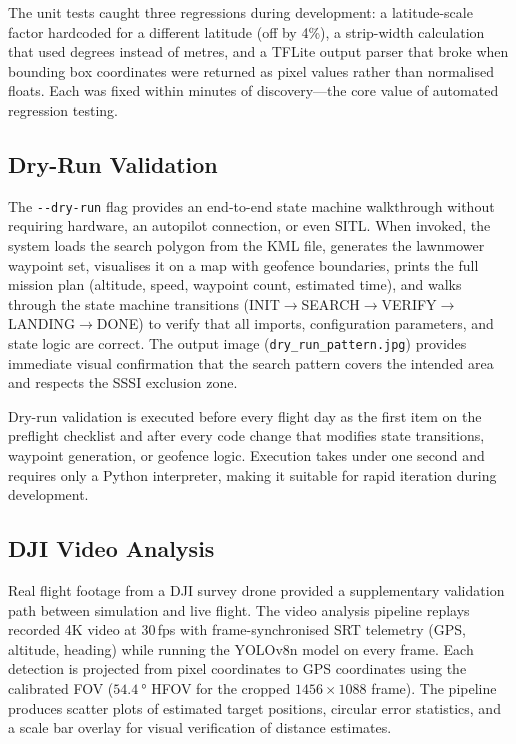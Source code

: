 The unit tests caught three regressions during development: a latitude-scale factor hardcoded for a different latitude (off by 4\%), a strip-width calculation that used degrees instead of metres, and a TFLite output parser that broke when bounding box coordinates were returned as pixel values rather than normalised floats.  Each was fixed within minutes of discovery---the core value of automated regression testing.

\subsection{Dry-Run Validation}\label{sec:dry-run}

The \texttt{-{}-dry-run} flag provides an end-to-end state machine walkthrough without requiring hardware, an autopilot connection, or even SITL. When invoked, the system loads the search polygon from the KML file, generates the lawnmower waypoint set, visualises it on a map with geofence boundaries, prints the full mission plan (altitude, speed, waypoint count, estimated time), and walks through the state machine transitions (INIT$\to$SEARCH$\to$VERIFY$\to$LANDING$\to$DONE) to verify that all imports, configuration parameters, and state logic are correct. The output image (\texttt{dry\_run\_pattern.jpg}) provides immediate visual confirmation that the search pattern covers the intended area and respects the SSSI exclusion zone.

Dry-run validation is executed before every flight day as the first item on the preflight checklist and after every code change that modifies state transitions, waypoint generation, or geofence logic. Execution takes under one second and requires only a Python interpreter, making it suitable for rapid iteration during development.

\subsection{DJI Video Analysis}\label{sec:video-analysis}

Real flight footage from a DJI survey drone provided a supplementary validation path between simulation and live flight. The video analysis pipeline replays recorded 4K video at 30\,fps with frame-synchronised SRT telemetry (GPS, altitude, heading) while running the YOLOv8n model on every frame. Each detection is projected from pixel coordinates to GPS coordinates using the calibrated FOV ($\SI{54.4}{\degree}$ HFOV for the cropped $1456 \times 1088$ frame). The pipeline produces scatter plots of estimated target positions, circular error statistics, and a scale bar overlay for visual verification of distance estimates.

